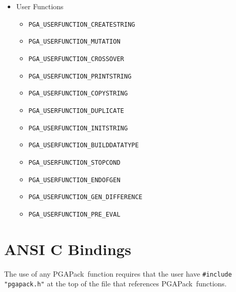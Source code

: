 \documentclass{report}
\newcommand{\pga}{PGAPack}
\begin{document}
\begin{itemize}
\item User Functions
\begin{itemize}
\item \verb+PGA_USERFUNCTION_CREATESTRING+
\item \verb+PGA_USERFUNCTION_MUTATION+
\item \verb+PGA_USERFUNCTION_CROSSOVER+
\item \verb+PGA_USERFUNCTION_PRINTSTRING+
\item \verb+PGA_USERFUNCTION_COPYSTRING+
\item \verb+PGA_USERFUNCTION_DUPLICATE+
\item \verb+PGA_USERFUNCTION_INITSTRING+
\item \verb+PGA_USERFUNCTION_BUILDDATATYPE+
\item \verb+PGA_USERFUNCTION_STOPCOND+
\item \verb+PGA_USERFUNCTION_ENDOFGEN+
\item \verb+PGA_USERFUNCTION_GEN_DIFFERENCE+
\item \verb+PGA_USERFUNCTION_PRE_EVAL+
\end{itemize}

\end{itemize}

\section*{ANSI C Bindings}\label{app:bindings-c}

The use of any \pga\ function requires that the user have {\tt \#include
"pgapack.h"} at the top of the file that references \pga\ functions.
\vspace{.5in}
\end{document}
